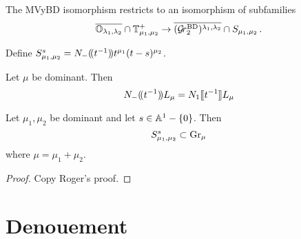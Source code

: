 \documentclass{article}
\begin{document}
\begin{corollary}
    The MVyBD isomorphism restricts to an isomorphism of subfamilies 
    \begin{equation}
        \overline{\OO_{\lambda_1,\lambda_2}}\cap\TT_{\mu_1,\mu_2}^+ \to \overline{(\Grbd[2])^{\lambda_1,\lambda_2}}\cap S_{\mu_1,\mu_2}\,. 
    \end{equation}
\end{corollary}

Define $S_{\mu_1,\mu_2}^s = N_-\xT[t^{-1}] t^{\mu_1} (t-s)^{\mu_2}$. 


\begin{lemma}[KWWY14]
    Let $\mu$ be dominant. Then 
    \begin{equation}
        N_{-}\xT[t^{-1}] L_\mu = N_1\xt[t^{-1}]L_\mu
    \end{equation}
\end{lemma}

\begin{lemma}%
    Let $\mu_1,\mu_2$ be dominant and let $s\in \AA^1 - \{0\}$. Then 
    \begin{equation}
        S_{\mu_1,\mu_2}^s \subset \Gr_\mu 
    \end{equation}
    where $\mu = \mu_1 + \mu_2$.
\end{lemma}

\begin{proof}
    Copy Roger's proof.
\end{proof}

\section{Denouement}
\end{document}
